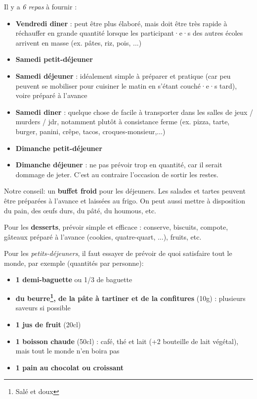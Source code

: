 Il y a \emph{6 repas} à fournir :
\begin{itemize}
    \item \textbf{Vendredi diner} : peut être plus élaboré, mais doit être très rapide à réchauffer en grande quantité lorsque les participant·e·s des autres écoles arrivent en masse (ex. pâtes, riz, pois, ...)
    \item \textbf{Samedi petit-déjeuner}
    \item \textbf{Samedi déjeuner} : idéalement simple à préparer et pratique (car peu peuvent se mobiliser pour cuisiner le matin en s'étant couché·e·s tard), voire préparé à l'avance
    \item \textbf{Samedi diner} : quelque chose de facile à transporter dans les salles de jeux / murders / jdr, notamment plutôt à consistance ferme (ex.  pizza, tarte, burger, panini, crêpe, tacos, croques-monsieur,...)
    \item \textbf{Dimanche petit-déjeuner}
    \item \textbf{Dimanche déjeuner} : ne pas prévoir trop en quantité, car il serait dommage de jeter. C'est au contraire l'occasion de sortir les restes.
\end{itemize}

\begin{Afaire}{}{}
Notre conseil: un \textbf{buffet froid} pour les déjeuners. Les salades et tartes peuvent être préparées à l'avance et laissées au frigo. On peut aussi mettre à disposition du pain, des œufs durs, du pâté, du houmous, etc.
\end{Afaire}

Pour les \textbf{desserts}, prévoir simple et efficace : conserve, biscuits, compote, gâteaux préparé à l'avance (cookies, quatre-quart, ...), fruits, etc.

Pour les \emph{petits-déjeuners}, il faut essayer de prévoir de quoi satisfaire tout le monde, par exemple (quantités par personne):
\begin{itemize}
    \item \textbf{1 demi-baguette} ou 1/3 de baguette
    \item \textbf{du beurre\footnote{Salé et doux}, de la pâte à tartiner et de la confitures} (10g) : plusieurs saveurs si possible
    \item \textbf{1 jus de fruit} (20cl)
    \item \textbf{1 boisson chaude} (50cl) : café, thé et lait (+2 bouteille de lait végétal), mais tout le monde n'en boira pas
    \item \textbf{1 pain au chocolat ou croissant}
\end{itemize}

